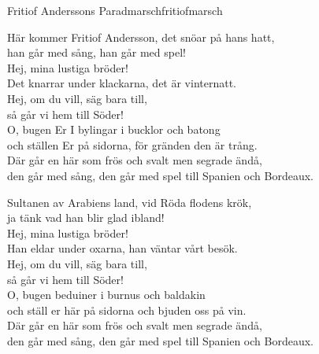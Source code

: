 \begin{song}{Fritiof Anderssons Paradmarsch}{fritiofmarsch}
\begin{vers}
Här kommer Fritiof Andersson, det snöar på hans hatt,\\
han går med sång, han går med spel!\\
Hej, mina lustiga bröder!\\
Det knarrar under klackarna, det är vinternatt.\\
Hej, om du vill, säg bara till,\\
så går vi hem till Söder!\\
O, bugen Er I bylingar i bucklor och batong\\
och ställen Er på sidorna, för gränden den är trång.\\
Där går en här som frös och svalt men segrade ändå,\\
den går med sång, den går med spel till Spanien och Bordeaux.\\
\end{vers}
\begin{vers}
Sultanen av Arabiens land, vid Röda flodens krök,\\
ja tänk vad han blir glad ibland!\\
Hej, mina lustiga bröder!\\
Han eldar under oxarna, han väntar vårt besök.\\
Hej, om du vill, säg bara till,\\
så går vi hem till Söder!\\
O, bugen beduiner i burnus och baldakin\\
och ställ er här på sidorna och bjuden oss på vin.\\
Där går en här som frös och svalt men segrade ändå,\\
den går med sång, den går med spel till Spanien och Bordeaux.\\
\end{vers}

\newp


\end{song}
